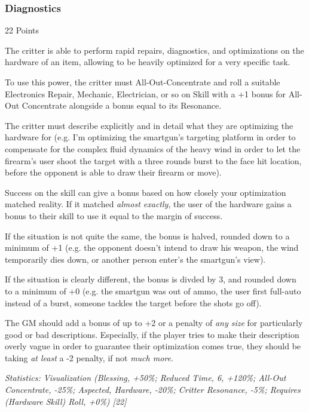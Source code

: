 \begin{multicols*}{3}
	\subsubsection{Diagnostics}\label{diagnostics}
	\begin{flushright}
		22 Points
	\end{flushright}

	The critter is able to perform rapid repairs, diagnostics, and optimizations on the hardware of an item, allowing to be heavily optimized for a very specific task.
	
	To use this power, the critter must All-Out-Concentrate and roll a suitable Electronics Repair, Mechanic, Electrician, or so on Skill with a +1 bonus for All-Out Concentrate alongside a bonus equal to its Resonance. 
	
	The critter must describe explicitly and in detail what they are optimizing the hardware for (e.g. I'm optimizing the smartgun's targeting platform in order to compensate for the complex fluid dynamics of the heavy wind in order to let the firearm's user shoot the target with a three rounds burst to the face hit location, before the opponent is able to draw their firearm or move). 
	
	Success on the skill can give a bonus based on how closely your optimization matched reality. If it matched \textit{almost exactly}, the user of the hardware gains a bonus to their skill to use it equal to the margin of success. 
	
	If the situation is not quite the same, the bonus is halved, rounded down to a minimum of +1 (e.g. the opponent doesn't intend to draw his weapon, the wind temporarily dies down, or another person enter's the smartgun's view). 
	
	If the situation is clearly different, the bonus is divded by 3, and rounded down to a minimum of +0 (e.g. the smartgun was out of ammo, the user first full-auto instead of a burst, someone tackles the target before the shots go off).
	
	The GM should add a bonus of up to +2 or a penalty of \textit{any size} for particularly good or bad descriptions. Especially, if the player tries to make their description overly vague in order to guarantee their optimization comes true, they should be taking \textit{at least} a -2 penalty, if not \textit{much more}.

	\textcolor{OliveGreen}{\textit{Statistics: Visualization (Blessing, +50\%; Reduced Time, 6, +120\%; All-Out Concentrate, -25\%; Aspected, Hardware, -20\%; Critter Resonance, -5\%; Requires (Hardware Skill) Roll, +0\%) [22] }}


\end{multicols*}

